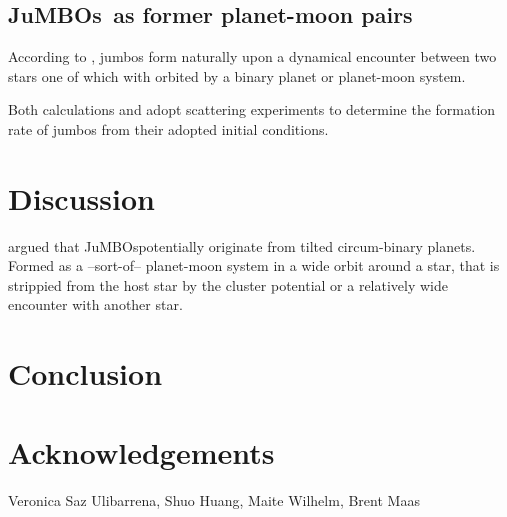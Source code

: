 \documentclass[aa]{lib/aa}
\newcommand{\jumbos}{\mbox{JuMBOs}}
\begin{document}
\subsection{\jumbos\, as former planet-moon pairs}

According to \cite{2023arXiv231015603C}, jumbos form naturally upon a
dynamical encounter between two stars one of which with orbited by a
binary planet or planet-moon system.

Both calculations \cite{2023arXiv231006016W} and
\cite{2023arXiv231015603C} adopt scattering experiments to determine
the formation rate of jumbos from their adopted initial conditions.


\section{Discussion}

\cite{2023arXiv231015603C} argued that \jumbos potentially originate
from tilted circum-binary planets. Formed as a --sort-of-- planet-moon
system in a wide orbit around a star, that is strippied from the host
star by the cluster potential or a relatively wide encounter with
another star. 



\section{Conclusion}

\section*{Acknowledgements}

Veronica Saz Ulibarrena, Shuo Huang, Maite Wilhelm, Brent Maas
    

    
\end{document}
